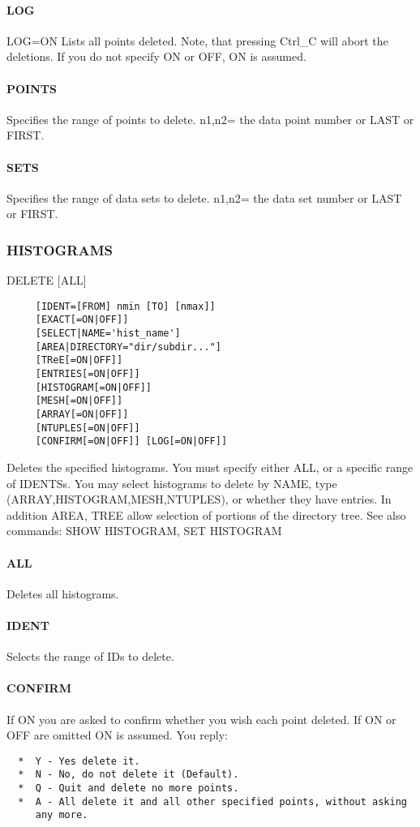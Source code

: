 \paragraph{LOG}
LOG=ON  Lists  all  points  deleted.  Note, that pressing Ctrl\_C will
abort the deletions.  If you do not specify ON or OFF, ON is assumed. 
\paragraph{POINTS}
Specifies  the  range  of  points  to  delete.  n1,n2= the data point
number or LAST or FIRST.  
\paragraph{SETS}
Specifies  the  range  of  data  sets to delete.  n1,n2= the data set
number or LAST or FIRST.  
\subsubsection{HISTOGRAMS}
DELETE [ALL] 
\begin{verbatim}
     [IDENT=[FROM] nmin [TO] [nmax]] 
     [EXACT[=ON|OFF]] 
     [SELECT|NAME='hist_name'] 
     [AREA|DIRECTORY="dir/subdir..."] 
     [TReE[=ON|OFF]] 
     [ENTRIES[=ON|OFF]] 
     [HISTOGRAM[=ON|OFF]] 
     [MESH[=ON|OFF]] 
     [ARRAY[=ON|OFF]] 
     [NTUPLES[=ON|OFF]] 
     [CONFIRM[=ON|OFF]] [LOG[=ON|OFF]] 
\end{verbatim}

Deletes  the  specified  histograms.  You must specify either ALL, or a
specific range of IDENTSs.  You may  select  histograms  to  delete  by
NAME,   type   (ARRAY,HISTOGRAM,MESH,NTUPLES),  or  whether  they  have
entries.  In addition AREA, TREE allow selection  of  portions  of  the
directory tree.  
See also commands:  SHOW HISTOGRAM, SET HISTOGRAM 
\paragraph{ALL}
Deletes all histograms.  
\paragraph{IDENT}
Selects the range of IDs to delete.  
\paragraph{CONFIRM}
If  ON  you are asked to confirm whether you wish each point deleted.
If ON or OFF are omitted ON is assumed.  You reply:  
\begin{verbatim}
  *  Y - Yes delete it.  
  *  N - No, do not delete it (Default).  
  *  Q - Quit and delete no more points.  
  *  A - All delete it and all other specified points, without asking
     any more.  
\end{verbatim}
